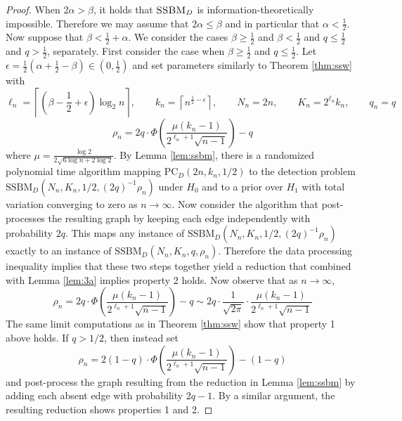 \begin{proof}
When $2 \alpha > \beta$, it holds that $\textsc{SSBM}_D$ is information-theoretically impossible. Therefore we may assume that $2\alpha \le \beta$ and in particular that $\alpha < \frac{1}{2}$. Now suppose that $\beta < \frac{1}{2} + \alpha$. We consider the cases $\beta \ge \frac{1}{2}$ and $\beta < \frac{1}{2}$ and $q \le \frac{1}{2}$ and $q > \frac{1}{2}$, separately. First consider the case when $\beta \ge \frac{1}{2}$ and $q \le \frac{1}{2}$. Let $\epsilon = \frac{1}{2} \left( \alpha + \frac{1}{2} - \beta \right) \in \left( 0, \frac{1}{2} \right)$ and set parameters similarly to Theorem \ref{thm:ssw} with
$$\ell_n = \left\lceil \left( \beta - \frac{1}{2} + \epsilon \right) \log_2 n \right\rceil, \quad \quad k_n = \left\lceil n^{\frac{1}{2} - \epsilon} \right\rceil, \quad \quad N_n = 2n, \quad \quad K_n = 2^{\ell_n} k_n, \quad \quad q_n = q$$
$$\rho_n = 2q \cdot \Phi\left( \frac{\mu(k_n - 1)}{2^{\ell_n + 1}\sqrt{n- 1}} \right) - q$$
where $\mu = \frac{\log 2}{2 \sqrt{6 \log n + 2\log 2}}$. By Lemma \ref{lem:ssbm}, there is a randomized polynomial time algorithm mapping $\text{PC}_D(2n, k_n, 1/2)$ to the detection problem $\text{SSBM}_D(N_n, K_n, 1/2, (2q)^{-1} \rho_n)$ under $H_0$ and to a prior over $H_1$ with total variation converging to zero as $n \to \infty$. Now consider the algorithm that post-processes the resulting graph by keeping each edge independently with probability $2q$. This maps any instance of $\text{SSBM}_D(N_n, K_n, 1/2, (2q)^{-1} \rho_n)$ exactly to an instance of $\text{SSBM}_D(N_n, K_n, q, \rho_n)$. Therefore the data processing inequality implies that these two steps together yield a reduction that combined with Lemma \ref{lem:3a} implies property 2 holds. Now observe that as $n \to \infty$,
$$\rho_n = 2q \cdot \Phi\left( \frac{\mu(k_n - 1)}{2^{\ell_n + 1}\sqrt{n- 1}} \right) - q \sim 2q \cdot \frac{1}{\sqrt{2\pi}} \cdot \frac{\mu(k_n - 1)}{2^{\ell_n + 1}\sqrt{n- 1}}$$
The same limit computations as in Theorem \ref{thm:ssw} show that property 1 above holds. If $q > 1/2$, then instead set
$$\rho_n = 2(1 - q) \cdot \Phi\left( \frac{\mu(k_n - 1)}{2^{\ell_n + 1}\sqrt{n- 1}} \right) - (1 - q)$$
and post-process the graph resulting from the reduction in Lemma \ref{lem:ssbm} by adding each absent edge with probability $2q - 1$. By a similar argument, the resulting reduction shows properties 1 and 2.


\end{proof}
